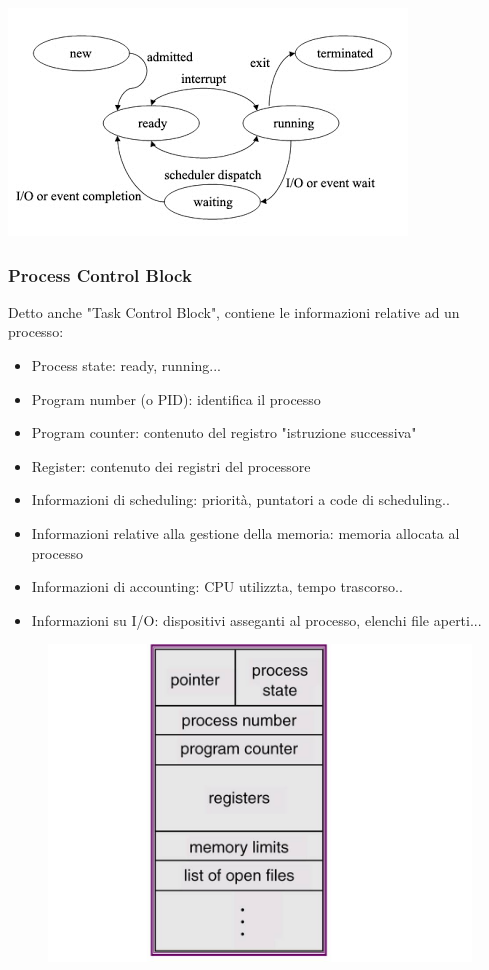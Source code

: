 \documentclass[11pt]{article}
\begin{document}
\includegraphics[scale=0.9]{processStateDiagram.jpg}

\subsubsection{Process Control Block}
Detto anche "Task Control Block", contiene le informazioni relative ad un processo:
\begin{itemize}
	\item Process state: ready, running...
	\item Program number (o PID): identifica il processo
	\item Program counter: contenuto del registro "istruzione successiva"
	\item Register: contenuto dei registri del processore
	\item Informazioni di scheduling: priorità, puntatori a code di scheduling..
	\item Informazioni relative alla gestione della memoria: memoria allocata al processo
	\item Informazioni di accounting: CPU utilizzta, tempo trascorso..
	\item Informazioni su I/O: dispositivi asseganti al processo, elenchi file aperti...
\end{itemize}
\begin{figure}[ht]
\includegraphics[scale=0.3]{ProcessControl.jpg}
\centering
\end{figure}
\end{document}

